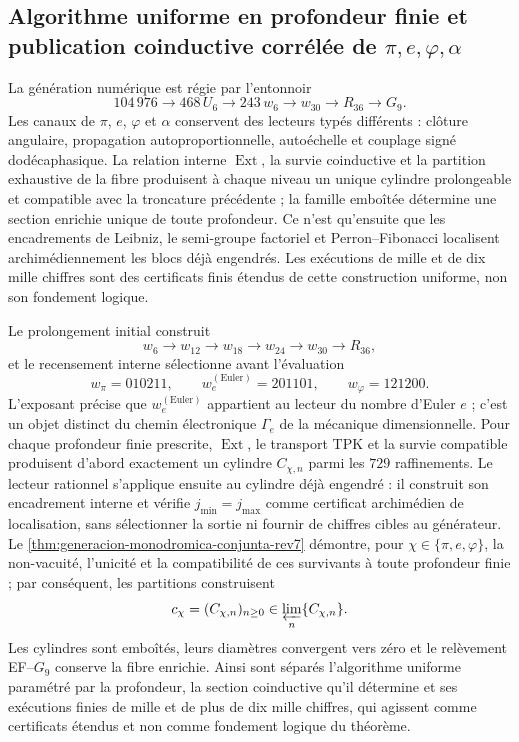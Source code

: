 \subsection*{Algorithme uniforme en profondeur finie et publication coinductive
corrélée de \texorpdfstring{\(\pi,e,\varphi,\alpha\)}{pi, e, phi, alpha}}

La génération numérique est régie par l'entonnoir
\[
 104\,976\to468\,U_6\to243\,w_6
 \to w_{30}\to R_{36}\to G_9.
\]
Les canaux de \(\pi\), \(e\), \(\varphi\) et \(\alpha\) conservent des lecteurs
typés différents : clôture angulaire, propagation autoproportionnelle,
autoéchelle et couplage signé dodécaphasique. La relation interne
\(\operatorname{Ext}\), la survie coinductive et la partition
exhaustive de la fibre produisent à chaque niveau un unique cylindre prolongeable
et compatible avec la troncature précédente ; la famille emboîtée détermine
une section enrichie unique de toute profondeur. Ce n'est qu'ensuite que les
encadrements de Leibniz, le semi-groupe factoriel et Perron--Fibonacci localisent
archimédiennement les blocs déjà engendrés. Les exécutions de mille et de dix mille
chiffres sont des certificats finis étendus de cette construction uniforme, non son
fondement logique.

Le prolongement initial construit
\[
 w_6\longrightarrow w_{12}\longrightarrow w_{18}
 \longrightarrow w_{24}\longrightarrow w_{30}
 \longrightarrow R_{36},
\]
et le recensement interne sélectionne avant l'évaluation
\[
 w_\pi=010211,\qquad w_e^{(\mathrm{Euler})}=201101,\qquad
 w_\varphi=121200.
\]
L'exposant précise que \(w_e^{(\mathrm{Euler})}\) appartient au lecteur du
nombre d'Euler \(e\) ; c'est un objet distinct du chemin électronique
\(\Gamma_e\) de la mécanique dimensionnelle.
Pour chaque profondeur finie prescrite, \(\operatorname{Ext}\), le
transport TPK et la survie compatible produisent d'abord exactement un
cylindre \(C_{\chi,n}\) parmi les \(729\) raffinements. Le lecteur rationnel
s'applique ensuite au cylindre déjà engendré : il construit son encadrement interne et
vérifie \(j_{\min}=j_{\max}\) comme certificat archimédien de localisation,
sans sélectionner la sortie ni fournir de chiffres cibles au générateur. Le
\cref{thm:generacion-monodromica-conjunta-rev7} démontre, pour
\(\chi\in\{\pi,e,\varphi\}\), la non-vacuité, l'unicité et la
compatibilité de ces survivants à toute profondeur finie ; par conséquent,
les partitions construisent
\[
 c_\chi=(C_{\chi,n})_{n\ge0}
 \in\varprojlim_n\{C_{\chi,n}\}.
\]
Les cylindres sont emboîtés, leurs diamètres convergent vers zéro et le
relèvement EF--\(G_9\) conserve la fibre enrichie. Ainsi sont
séparés l'algorithme uniforme paramétré par la profondeur, la section
coinductive qu'il détermine et ses exécutions finies de mille et de plus de dix
mille chiffres, qui agissent comme certificats étendus et non comme fondement
logique du théorème.

